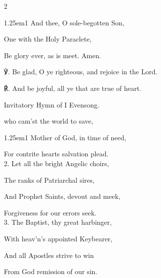 \begin{paracol}{2}
\begin{hangparas}{1.25em}{1}
And thee, O sole-begotten Son,

One with the Holy Paraclete,

Be glory ever, as is meet. Amen.\\
\end{hangparas}

℣. Be glad, O ye righteous, and rejoice in the Lord.

℟. And be joyful, all ye that are true of heart.


\switchcolumn

\vspace{-1\baselineskip}

\mattins
{}

\begin{rubric}
	Invitatory Hymn of I Evensong.
\end{rubric}

\mattinsOfficeHymn
{} who cam'st the world to save,


\begin{hangparas}{1.25em}{1}
Mother of God, in time of need,

For contrite hearts salvation plead.\\

2. Let all the bright Angelic choirs,

The ranks of Patriarchal sires,

And Prophet Saints, devout and meek,

Forgiveness for our errors seek.\\

3. The Baptist, thy great harbinger,

With heav'n's appointed Keybearer,

And all Apostles strive to win

From God remission of our sin.\\


\end{hangparas}
\end{paracol}
